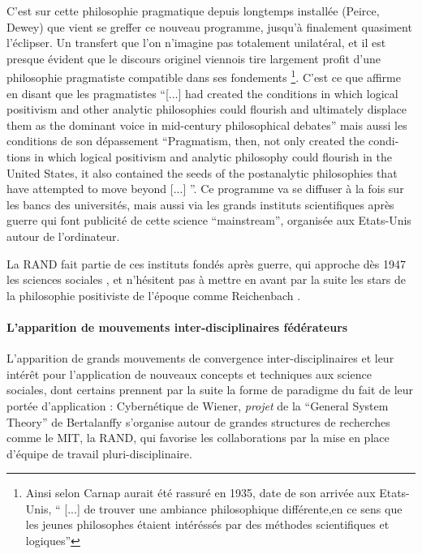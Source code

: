 C'est sur cette philosophie pragmatique depuis longtemps installée (Peirce, Dewey) que vient se greffer ce nouveau programme, jusqu'à finalement quasiment l'éclipser. Un transfert que l'on n'imagine pas totalement unilatéral, et il est presque évident que le discours originel viennois tire largement profit d'une philosophie pragmatiste compatible dans ses fondements \footnote{ Ainsi selon \textcite[149]{Ouelbani2006} Carnap aurait été rassuré en 1935, date de son arrivée aux Etats-Unis, \enquote{ [...] de trouver une ambiance philosophique différente,en ce sens que les jeunes philosophes étaient intéréssés par des méthodes scientifiques et logiques}}. C'est ce que \textcite[123]{Wilson1995} affirme en disant que les pragmatistes \foreignquote{english}{[...] had created the conditions in which logical positivism and other analytic philosophies could flourish and ultimately displace them as the dominant voice in mid-century philosophical debates} mais aussi les conditions de son dépassement \foreignquote{english}{Pragmatism, then, not only created the conditions in which logical positivism and analytic philosophy could flourish in the United States, it also contained the seeds of the postanalytic philosophies that have attempted to move beyond [...] }. Ce programme va se diffuser à la fois sur les bancs des universités, mais aussi via les grands instituts scientifiques après guerre qui font publicité de cette science \foreignquote{english}{mainstream}, organisée aux Etats-Unis autour de l'ordinateur. 

La RAND fait partie de ces instituts fondés après guerre, qui approche dès 1947 les sciences sociales \autocite{Rand106}, et n'hésitent pas à mettre en avant par la suite les stars de la philosophie positiviste de l'époque comme Reichenbach \autocite[384-385]{Barnes2011} .

\paragraph{L'apparition de mouvements inter-disciplinaires fédérateurs}

L'apparition de grands mouvements de convergence inter-disciplinaires et leur intérêt pour l'application de nouveaux concepts et techniques aux science sociales, dont certains prennent par la suite la forme de paradigme du fait de leur portée d'application : Cybernétique de Wiener, \textit{projet} de la \foreignquote{english}{General System Theory} de Bertalanffy \autocite[9]{Pouvreau2013} s'organise autour de grandes structures de recherches comme le MIT, la RAND, qui favorise les collaborations par la mise en place d'équipe de travail pluri-disciplinaire.

